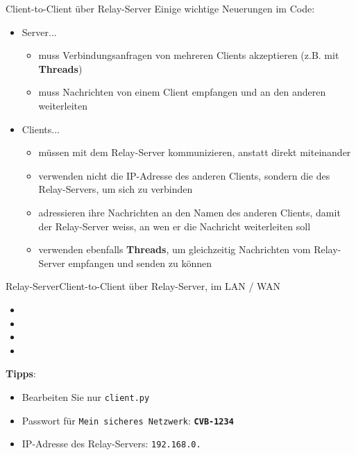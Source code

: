 \begin{frame}{Client-to-Client über Relay-Server}
    Einige wichtige Neuerungen im Code:
    \begin{itemize}[<+->]
        \item Server...
              \begin{itemize}
                  \item muss Verbindungsanfragen von mehreren Clients akzeptieren (z.B. mit \textbf{Threads})
                  \item muss Nachrichten von einem Client empfangen und an den anderen weiterleiten
              \end{itemize}
        \item Clients...
              \begin{itemize}
                  \item müssen mit dem Relay-Server kommunizieren, anstatt direkt miteinander
                  \item verwenden nicht die \acrshort{IP}-Adresse des anderen Clients, sondern die des Relay-Servers, um sich zu verbinden
                  \item adressieren ihre Nachrichten an den Namen des anderen Clients, damit der Relay-Server weiss, an wen er die Nachricht weiterleiten soll
                  \item verwenden ebenfalls \textbf{Threads}, um gleichzeitig Nachrichten vom Relay-Server empfangen und senden zu können
              \end{itemize}
    \end{itemize}
\end{frame}

\begin{frame}{Relay-Server}{Client-to-Client über Relay-Server, im \acrshort{LAN} / \acrshort{WAN}}
    \begin{itemize}
        \item {}
        \item {}
        \item {}
        \item {}
    \end{itemize}
    \textbf{Tipps}:
    \begin{itemize}
        \item Bearbeiten Sie nur \texttt{client.py}
        \item Passwort für \texttt{Mein sicheres Netzwerk}: \textbf{\texttt{CVB-1234}}
        \item \acrshort{IP}-Adresse des Relay-Servers: \texttt{192.168.0.}\TextField[name=ip-relay, width=1.5cm,print,borderwidth=0, backgroundcolor={0.9 0.9 0.9}]{}
    \end{itemize}

\end{frame}